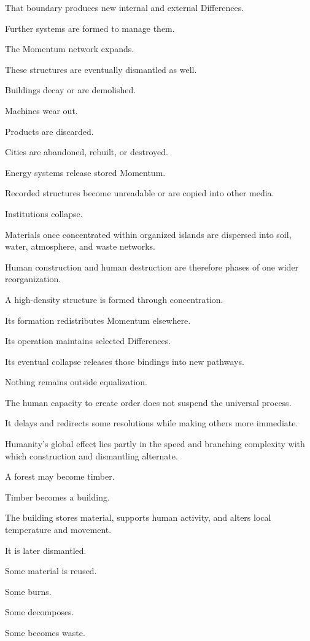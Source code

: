 That boundary produces new internal and external Differences.

Further systems are formed to manage them.

The Momentum network expands.

These structures are eventually dismantled as well.

Buildings decay or are demolished.

Machines wear out.

Products are discarded.

Cities are abandoned, rebuilt, or destroyed.

Energy systems release stored Momentum.

Recorded structures become unreadable or are copied into other media.

Institutions collapse.

Materials once concentrated within organized islands are dispersed into soil, water, atmosphere, and waste networks.

Human construction and human destruction are therefore phases of one wider reorganization.

A high-density structure is formed through concentration.

Its formation redistributes Momentum elsewhere.

Its operation maintains selected Differences.

Its eventual collapse releases those bindings into new pathways.

Nothing remains outside equalization.

The human capacity to create order does not suspend the universal process.

It delays and redirects some resolutions while making others more immediate.

Humanity’s global effect lies partly in the speed and branching complexity with which construction and dismantling alternate.

A forest may become timber.

Timber becomes a building.

The building stores material, supports human activity, and alters local temperature and movement.

It is later dismantled.

Some material is reused.

Some burns.

Some decomposes.

Some becomes waste.

